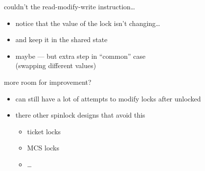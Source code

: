 \begin{frame}{couldn't the read-modify-write instruction\ldots}
    \begin{itemize}
    \item notice that the value of the lock isn't changing\ldots
    \item and keep it in the shared state
        \vspace{.5cm}
    \item maybe --- but extra step in ``common'' case \\ (swapping different values)
    \end{itemize}
\end{frame}

\begin{frame}{more room for improvement?}
    \begin{itemize}
    \item can still have a lot of attempts to modify locks after unlocked
    \item there other spinlock designs that avoid this
        \begin{itemize}
        \item ticket locks
        \item MCS locks
        \item \ldots
        \end{itemize}
    \end{itemize}
\end{frame}
